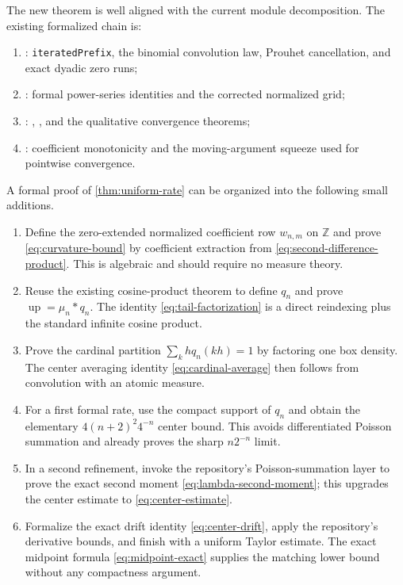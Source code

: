 \documentclass[11pt,oneside]{article}
\theoremstyle{definition}
\theoremstyle{remark}
\newcommand{\Z}{\mathbb Z}
\newcommand{\Up}{\operatorname{up}}
\begin{document}
The new theorem is well aligned with the current module decomposition.
The existing formalized chain is:
\begin{enumerate}
\item {}: \texttt{iteratedPrefix}, the binomial
      convolution law, Prouhet cancellation, and exact dyadic zero runs;
\item {}: formal power-series identities and the
      corrected normalized grid;
\item {}:
      ,
      , and the
      qualitative convergence theorems;
\item {}: coefficient monotonicity and the
      moving-argument squeeze used for pointwise convergence.
\end{enumerate}

A formal proof of \cref{thm:uniform-rate} can be organized into the following
small additions.

\begin{enumerate}
\item Define the zero-extended normalized coefficient row $w_{n,m}$ on $\Z$ and
      prove \eqref{eq:curvature-bound} by coefficient extraction from
      \eqref{eq:second-difference-product}.  This is algebraic and should require
      no measure theory.

\item Reuse the existing cosine-product theorem to define $q_n$ and prove
      $\Up=\mu_n*q_n$.  The identity \eqref{eq:tail-factorization} is a direct
      reindexing plus the standard infinite cosine product.

\item Prove the cardinal partition
      $\sum_k hq_n(kh)=1$ by factoring one box density.  The center averaging
      identity \eqref{eq:cardinal-average} then follows from convolution with an
      atomic measure.

\item For a first formal rate, use the compact support of $q_n$ and obtain the
      elementary $4(n+2)^2 4^{-n}$ center bound.  This avoids differentiated
      Poisson summation and already proves the sharp $n2^{-n}$ limit.

\item In a second refinement, invoke the repository's Poisson-summation layer to
      prove the exact second moment \eqref{eq:lambda-second-moment}; this upgrades
      the center estimate to \eqref{eq:center-estimate}.

\item Formalize the exact drift identity \eqref{eq:center-drift}, apply the
      repository's derivative bounds, and finish with a uniform Taylor estimate.
      The exact midpoint formula \eqref{eq:midpoint-exact} supplies the matching
      lower bound without any compactness argument.
\end{enumerate}
\end{document}
